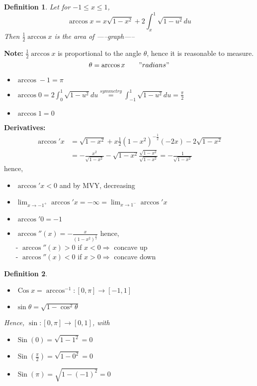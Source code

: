 \documentclass[12pt]{article}
\theoremstyle{plain}
\newtheorem{definition}{Definition}[subsection]
\DeclareMathOperator{\Sin}{Sin}
\DeclareMathOperator{\Cos}{Cos}
\begin{document}
\begin{definition}
	Let for $-1\leq x\leq 1$, 
	\[
		\arccos x = x \sqrt{1-x^2} + 2\int_x^1 \sqrt{1-u^2} du
	\]
	Then $\frac12 \arccos x$ is the area of 
	-----graph-----
\end{definition}

\textbf{Note:} $\frac12\arccos x$ is proportional to the angle $\theta$,
hence it is reasonable to measure. 
\[
	\theta = \arccos x \qquad "radians"
\]
\begin{itemize}
	\item $\arccos -1 = \pi$
	\item $\arccos 0 = 2\int_0^1 \sqrt{1-u^2} du \overset{symmetry}{=}
		\int_{-1}^1 \sqrt{1-u^2} du = \frac{\pi}2$
	\item $\arccos 1 = 0$
\end{itemize}

\textbf{Derivatives:}
\begin{align*}
	\arccos ' x 
	&= \sqrt{1-x^2} + x\frac12(1-x^2)^{-\frac 12} (-2x) - 2\sqrt{1-x^2}\\
	&= -\frac{x^2}{\sqrt{1-x^2}}-\sqrt{1-x^2}\frac{\sqrt{1-x^2}}
		{\sqrt{1-x^2}} = -\frac{1}{\sqrt{1-x^2}}
\end{align*}
hence, 
\begin{itemize}
	\item $\arccos 'x < 0$ and by MVY, decreasing
	\item $\lim_{x\to -1^+} \arccos 'x = -\infty = \lim_{x\to 1^-}
		\arccos 'x$ 
	\item $\arccos '0=-1$
	\item $\arccos ''(x) = -\frac x{(1-x^2)^{\frac 32}}$ hence, \\
		- $\arccos ''(x) > 0$ if $x <0  \Rightarrow $ concave up\\
		- $\arccos ''(x) <0$ if $x > 0 \Rightarrow$ concave down\\
\end{itemize}

\begin{definition}
	$ $
	\begin{itemize}
		\item $\Cos x = \arccos ^{-1} : [0,\pi] \to [-1,1]$

		\item $\sin \theta = \sqrt{1-\cos^2 \theta}$
	\end{itemize}
			
	Hence, $\sin:[0,\pi] \to [0,1]$, with 
	\begin{itemize}
		\item $\Sin(0) = \sqrt{1-1^2} = 0$
		\item $\Sin(\frac{\pi}2) = \sqrt{1-0^2} = 0$
		\item $\Sin(\pi) = \sqrt{1-(-1)^2} = 0$
	\end{itemize}
\end{definition}
\end{document}
